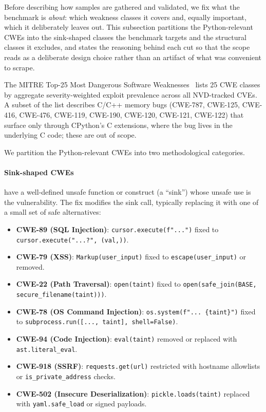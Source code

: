 Before describing how samples are gathered and validated, we fix what
the benchmark is \emph{about}: which weakness classes it covers and,
equally important, which it deliberately leaves out. This subsection
partitions the Python-relevant CWEs into the sink-shaped classes the
benchmark targets and the structural classes it excludes, and states
the reasoning behind each cut so that the scope reads as a deliberate
design choice rather than an artifact of what was convenient to scrape.

The MITRE Top-25 Most Dangerous Software Weaknesses~\cite{mitre_top25}
lists 25 CWE classes by aggregate severity-weighted exploit prevalence
across all NVD-tracked CVEs. A subset of the list describes C/C++
memory bugs (CWE-787, CWE-125, CWE-416, CWE-476, CWE-119, CWE-190,
CWE-120, CWE-121, CWE-122) that surface only through CPython's C
extensions, where the bug lives in the underlying C code; these are
out of scope.

We partition the Python-relevant CWEs into two methodological
categories.

\paragraph{Sink-shaped CWEs} have a well-defined unsafe function or
construct (a ``sink'') whose unsafe use is the vulnerability. The fix
modifies the sink call, typically replacing it with one of a small set
of safe alternatives:
\begin{sloppypar}
\begin{itemize}
\item \textbf{CWE-89 (SQL Injection)}: \texttt{cursor.execute(f"...")}
  fixed to \texttt{cursor.execute("...?", (val,))}.
\item \textbf{CWE-79 (XSS)}: \texttt{Markup(user\_input)} fixed to
  \texttt{escape(user\_input)} or removed.
\item \textbf{CWE-22 (Path Traversal)}: \texttt{open(taint)} fixed to
  \texttt{open(safe\_join(BASE, secure\_filename(taint)))}.
\item \textbf{CWE-78 (OS Command Injection)}: \texttt{os.system(f"...
  \{taint\}")} fixed to \texttt{subprocess.run([...,~taint],
  shell=False)}.
\item \textbf{CWE-94 (Code Injection)}: \texttt{eval(taint)} removed
  or replaced with \texttt{ast.literal\_eval}.
\item \textbf{CWE-918 (SSRF)}: \texttt{requests.get(url)} restricted
  with hostname allowlists or \texttt{is\_private\_address} checks.
\item \textbf{CWE-502 (Insecure Deserialization)}:
  \texttt{pickle.loads(taint)} replaced with
  \texttt{yaml.safe\_load} or signed payloads.
\end{itemize}
\end{sloppypar}


